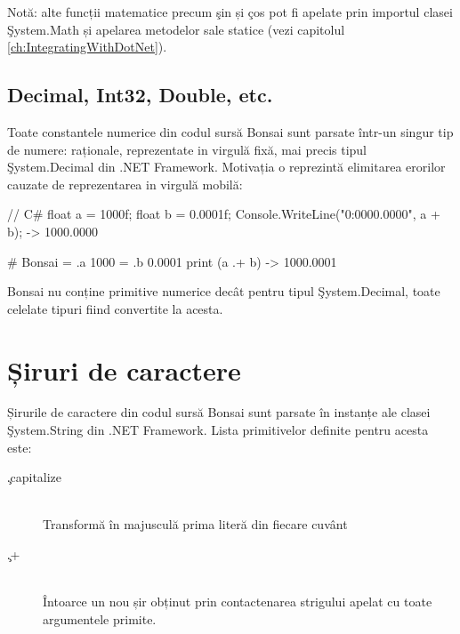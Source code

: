 \documentclass[12pt,a4paper]{memoir}
\begin{document}
Notă: alte funcții matematice precum \c{sin} și \c{cos} pot fi apelate prin importul clasei \c{System.Math} și apelarea metodelor sale statice (vezi capitolul \ref{ch:IntegratingWithDotNet}).

\subsection{Decimal, Int32, Double, etc.}

Toate constantele numerice din codul sursă Bonsai sunt parsate într-un singur tip de numere: raționale, reprezentate in virgulă fixă, mai precis tipul \c{System.Decimal} din .NET Framework. Motivația o reprezintă elimitarea erorilor cauzate de reprezentarea in virgulă mobilă:
\begin{code}
// C#
float a = 1000f;
float b = 0.0001f;
Console.WriteLine("{0:0000.0000}", a + b);
  -> 1000.0000
\end{code}
\begin{code}
# Bonsai
= .a 1000
= .b 0.0001
print (a .+ b)
  -> 1000.0001
\end{code}

Bonsai nu conține primitive numerice decât pentru tipul \c{System.Decimal}, toate celelate tipuri fiind convertite la acesta.

\section{Șiruri de caractere}

Șirurile de caractere din codul sursă Bonsai sunt parsate în instanțe ale clasei \c{System.String} din .NET Framework. Lista primitivelor definite pentru acesta este:

\begin{description}
\item[\c{.capitalize}]\hfill\\Transformă în majusculă prima literă din fiecare cuvânt
\item[\c{.+}]\hfill\\Întoarce un nou șir obținut prin contactenarea strigului apelat cu toate argumentele primite.
\end{description}
\end{document}
